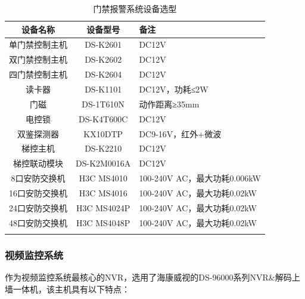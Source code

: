 \documentclass{gdutart}
\begin{document}
      \begin{table}[htpb]
        \begin{center}
          \caption{门禁报警系统设备选型}\label{tab:tab18}
          \begin{tabularx}{\linewidth}{c|c|Y}
            \Xhline{1.5pt}
            设备名称 & 设备型号 & 备注 \\
            \hline
            单门禁控制主机 & DS-K2601 & DC12V \\
            \hline
            双门禁控制主机 & DS-K2602 & DC12V \\
            \hline
            四门禁控制主机 & DS-K2604 & DC12V \\
            \hline
            读卡器 & DS-K1101 & DC12V，功耗≤2W \\
            \hline
            门磁 & DS-1T610N & 动作距离≥35mm \\
            \hline
            电控锁 & DS-K4T600C & DC12V \\
            \hline
            双鉴探测器 & KX10DTP & DC9-16V，红外+微波 \\
            \hline
            梯控主机 & DS-K2210 & DC12V \\
            \hline
            梯控联动模块 & DS-K2M0016A & DC12V \\
            \hline
            8口安防交换机  & H3C MS4010 & 100-240V AC，最大功耗0.006kW \\
            \hline
            16口安防交换机 & H3C MS4016 & 100-240V AC，最大功耗0.02kW \\
            \hline
            24口安防交换机 & H3C MS4024P & 100-240V AC，最大功耗0.02kW \\
            \hline
            48口安防交换机 & H3C MS4048P & 100-240V AC，最大功耗0.02kW \\
            \Xhline{1.5pt}
          \end{tabularx}
        \end{center}
      \end{table}

      \subsubsection{视频监控系统}
      作为视频监控系统最核心的NVR，选用了海康威视的DS-96000系列NVR\&解码上墙一体机，该主机具有以下特点：
\end{document}

